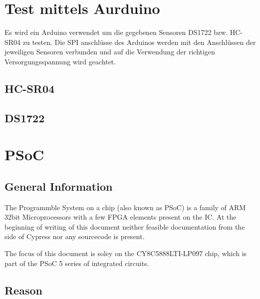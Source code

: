 \documentclass[12pt,a4paper]{article}
\def\psocdisasm{0}
\begin{document}
\section{Test mittels Aurduino}

Es wird ein Arduino verwendet um die gegebenen Sensoren DS1722 bzw. HC-SR04 zu 
testen. Die SPI anschlüsse des Arduinos werden mit den Anschlüssen der
jeweiligen Sensoren verbunden und auf die Verwendung der richtigen 
Versorgungsspannung wird geachtet.

\newpage
\subsection{HC-SR04}



\newpage
\subsection{DS1722}



\if\psocdisasm

\section{PSoC}

\subsection{General Information}

The Programmble System on a chip (also known as PSoC) is a family of ARM 32bit
Microprocessors with a few FPGA elements present on the IC. At the beginning of
writing of this document neither feasible documentation from the side of Cypress
nor any sourcecode is present.

The focus of this document is soley on the CY8C5888LTI-LP097 chip, which is part
of the PSoC 5 series of integrated circuits.

\subsection{Reason}
\end{document}
